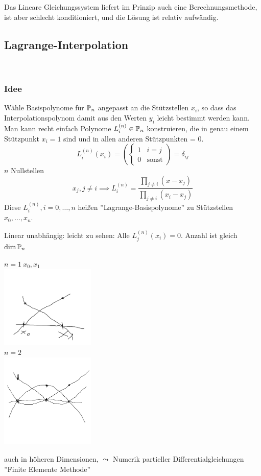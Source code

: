 Das Lineare Gleichungssystem liefert im Prinzip auch eine Berechnungsmethode, ist aber schlecht konditioniert, und die 
Lösung ist relativ aufwändig.

\subsection{Lagrange-Interpolation}\hfill\\
\subsubsection*{Idee} Wähle Basispolynome für $\mathbb{P}_n$ angepasst an die Stützstellen $x_i$, so dass das 
Interpolationspolynom damit aus den Werten $y_i$ leicht bestimmt werden kann. Man kann 
recht einfach Polynome $L_i^{(n)}\in\mathbb{P}_n$ konstruieren, die in genau einem Stützpunkt $x_i = 1$ sind und 
in allen anderen Stützpunkten = 0. $$L_i^{(n)}(x_i) = \left(\begin{cases}
    1& i=j\\ 0& \text{sonst}
\end{cases}\right) = \delta_{ij}$$
 $n$ Nullstellen $$x_j, j\neq i \implies L_i^{(n)} = \frac{\displaystyle\prod_{j\neq i}(x-x_j)}{\displaystyle\prod_{j\neq 
 i}(x_i-x_j)}$$
Diese $L_i^{(n)}, i=0, \dots, n$ heißen ''Lagrange-Basispolynome'' zu Stützstellen $x_0,\dots,x_n$.

Linear unabhängig: leicht zu sehen: Alle $L_j^{(n)}(x_i) = 0$. Anzahl ist gleich $\dim \mathbb{P}_n$

\begin{example} $n=1\  x_0,x_1$ \\
\includegraphics[width=45mm]{../Bilder/x_1_2.png}\\
$n=2$\\
\includegraphics[width=45mm]{../Bilder/x_1_2_3.png}\\
\end{example}
\begin{remark}
auch in höheren Dimensionen, $\leadsto$ Numerik partieller Differentialgleichungen ''Finite Elemente Methode'' \\ 
\end{remark}


